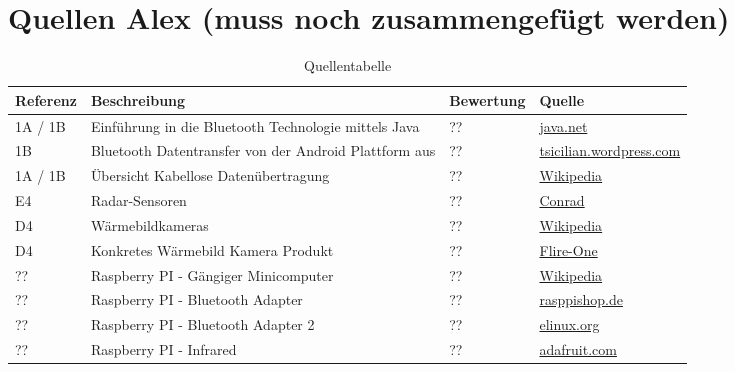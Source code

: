 \section{Quellen Alex (muss noch zusammengefügt werden)}

\begin{table}[h!]
	\centering
	\begin{tabular}{l l l l}
		Referenz & Beschreibung & Bewertung & Quelle \\
		\hline
        
        1A / 1B & Einführung in die Bluetooth Technologie mittels Java & ?? & \href{https://today.java.net/pub/a/today/2004/07/27/bluetooth.html}{java.net} \\
        
        1B & Bluetooth Datentransfer von der Android Plattform aus & ?? & \href{http://tsicilian.wordpress.com/2012/11/06/bluetooth-data-transfer-with-android/}{tsicilian.wordpress.com} \\
        
        1A / 1B & Übersicht Kabellose Datenübertragung & ?? & \href{http://de.wikipedia.org/w/index.php?title=Kabellose_\%C3\%9Cbertragungsverfahren&redirect=no}{Wikipedia} \\
        
        E4 & Radar-Sensoren & ?? & \href{http://www.conrad.ch/ce/de/overview/0231510/Radar-Sensoren}{Conrad} \\
        
        D4 & Wärmebildkameras & ?? & \href{http://de.wikipedia.org/wiki/W\%C3\%A4rmebildkamera}{Wikipedia} \\
        
        D4 & Konkretes Wärmebild Kamera Produkt & ?? & \href{http://www.mobilefun.co.uk/flir-one-personal-thermal-imaging-case-for-iphone-5-5s-p43472.htm}{Flire-One} \\
        
        ?? & Raspberry PI - Gängiger Minicomputer & ?? & \href{http://de.wikipedia.org/wiki/Raspberry_Pi}{Wikipedia} \\
        
        ?? & Raspberry PI - Bluetooth Adapter & ?? & \href{http://www.rasppishop.de/raspberry-pi-welt/netzwerk/w-lan/149/bluetooth-dongle-v2.0-adapter-fuer-raspberry-pi}{rasppishop.de} \\
        
        ?? & Raspberry PI - Bluetooth Adapter 2 & ?? & \href{http://elinux.org/RPi_USB_Bluetooth_adapters}{elinux.org} \\
        
        ?? & Raspberry PI - Infrared & ?? & \href{https://learn.adafruit.com/using-an-ir-remote-with-a-raspberry-pi-media-center/overview}{adafruit.com} \\
        
        
	\end{tabular}
	\caption{Quellentabelle}
	\label{tab:quelle}
\end{table}
